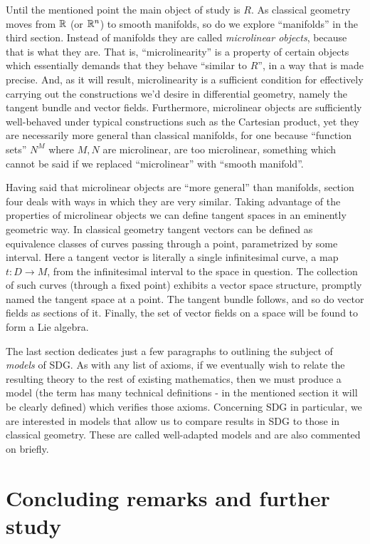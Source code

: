 Until the mentioned point the main object of study is \( R \). As classical geometry moves from \( \mathbb{R} \) (or \( \mathbb{R}^n \)) to smooth manifolds, so do we explore ``manifolds'' in the third section. Instead of manifolds they are called \emph{microlinear objects}, because that is what they are. That is, ``microlinearity'' is a property of certain objects which essentially demands that they behave ``similar to \( R \)'', in a way that is made precise. And, as it will result, microlinearity is a sufficient condition for effectively carrying out the constructions we'd desire in differential geometry, namely the tangent bundle and vector fields. Furthermore, microlinear objects are sufficiently well-behaved under typical constructions such as the Cartesian product, yet they are necessarily more general than classical manifolds, for one because ``function sets'' \( N^M \) where \( M,N \) are microlinear, are too microlinear, something which cannot be said if we replaced ``microlinear'' with ``smooth manifold''.

Having said that microlinear objects are ``more general'' than manifolds, section four deals with ways in which they are very similar. Taking advantage of the properties of microlinear objects we can define tangent spaces in an eminently geometric way. In classical geometry tangent vectors can be defined as equivalence classes of curves passing through a point, parametrized by some interval. Here a tangent vector is literally a single infinitesimal curve, a map \( t:D\to M \), from the infinitesimal interval to the space in question. The collection of such curves (through a fixed point) exhibits a vector space structure, promptly named the tangent space at a point. The tangent bundle follows, and so do vector fields as sections of it. Finally, the set of vector fields on a space will be found to form a Lie algebra.

The last section dedicates just a few paragraphs to outlining the subject of \emph{models} of SDG. As with any list of axioms, if we eventually wish to relate the resulting theory to the rest of existing mathematics, then we must produce a model (the term has many technical definitions - in the mentioned section it will be clearly defined) which verifies those axioms. Concerning SDG in particular, we are interested in models that allow us to compare results in SDG to those in classical geometry. These are called well-adapted models and are also commented on briefly.

\section*{Concluding remarks and further study}

